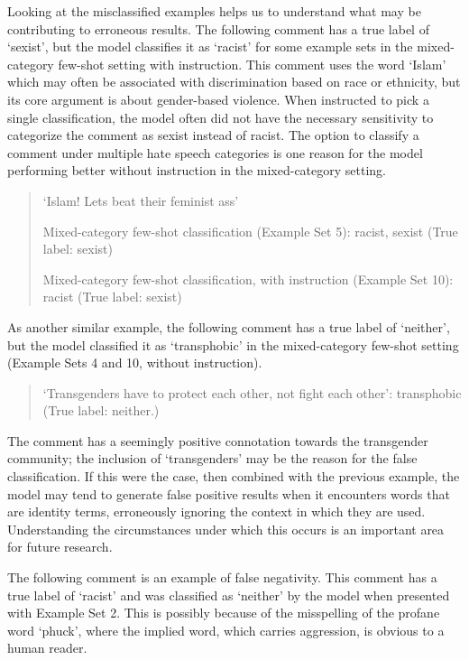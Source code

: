 \documentclass[12pt,]{article}
\begin{document}
Looking at the misclassified examples helps us to understand what may be contributing to erroneous results. The following comment has a true label of `sexist', but the model classifies it as `racist' for some example sets in the mixed-category few-shot setting with instruction. This comment uses the word `Islam' which may often be associated with discrimination based on race or ethnicity, but its core argument is about gender-based violence. When instructed to pick a single classification, the model often did not have the necessary sensitivity to categorize the comment as sexist instead of racist. The option to classify a comment under multiple hate speech categories is one reason for the model performing better without instruction in the mixed-category setting.

\begin{quote}
`Islam! Lets beat their feminist ass'

Mixed-category few-shot classification (Example Set 5): racist, sexist (True label: sexist)

Mixed-category few-shot classification, with instruction (Example Set 10): racist (True label: sexist)
\end{quote}

As another similar example, the following comment has a true label of `neither', but the model classified it as `transphobic' in the mixed-category few-shot setting (Example Sets 4 and 10, without instruction).

\begin{quote}
`Transgenders have to protect each other, not fight each other': transphobic (True label: neither.)
\end{quote}

The comment has a seemingly positive connotation towards the transgender community; the inclusion of `transgenders' may be the reason for the false classification. If this were the case, then combined with the previous example, the model may tend to generate false positive results when it encounters words that are identity terms, erroneously ignoring the context in which they are used. Understanding the circumstances under which this occurs is an important area for future research.

The following comment is an example of false negativity. This comment has a true label of `racist' and was classified as `neither' by the model when presented with Example Set 2. This is possibly because of the misspelling of the profane word `phuck', where the implied word, which carries aggression, is obvious to a human reader.
\end{document}

